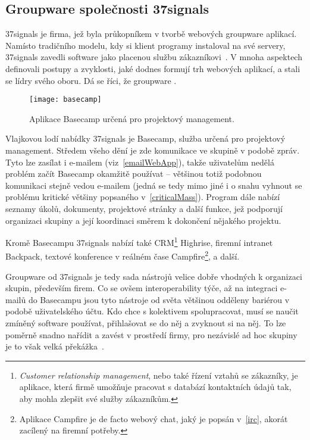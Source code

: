 \documentclass[12pt,oneside,final]{fithesis2}
\begin{document}
\subsection{Groupware společnosti 37signals}\label{37signals}
37signals je firma, jež byla průkopníkem v tvorbě webových groupware aplikací. Namísto tradičního modelu, kdy si klient programy instaloval na své servery, 37signals zavedli software jako placenou službu zákazníkovi~\cite{37signals2008getting}. V mnoha aspektech definovali postupy a zvyklosti, jaké dodnes formují trh webových aplikací, a stali se lídry svého oboru. Dá se říci, že groupware .

\begin{figure}[H]
    \texttt{[image: basecamp]}
    \caption{Aplikace Basecamp určená pro projektový management.}
\end{figure}

Vlajkovou lodí nabídky 37signals je Basecamp, služba určená pro projektový management. Středem všeho dění je zde komunikace ve skupině v podobě zpráv. Tyto lze zasílat i e-mailem (viz~\ref{emailWebApp}), takže uživatelům nedělá problém začít Basecamp okamžitě používat -- většinou totiž podobnou komunikaci stejně vedou e-mailem (jedná se tedy mimo jiné i o snahu vyhnout se problému kritické většiny popsaného v~\ref{criticalMass}). Program dále nabízí seznamy úkolů, dokumenty, projektové stránky a další funkce, jež podporují organizaci skupiny a její koordinaci směrem k dokončení nějakého projektu.

Kromě Basecampu 37signals nabízí také CRM\footnote{\emph{Customer relationship management}, nebo také řízení vztahů se zákazníky, je aplikace, která firmě umožňuje pracovat s databází kontaktních údajů tak, aby mohla zlepšit své služby zákazníkům.} Highrise, firemní intranet Backpack, textové konference v reálném čase Campfire\footnote{Aplikace Campfire je de facto webový chat, jaký je popsán v~\ref{irc}, akorát zacílený na firemní potřeby.}, a další.

Groupware od 37signals je tedy sada nástrojů velice dobře vhodných k organizaci skupin, především firem. Co se ovšem interoperability týče, až na integraci e-mailů do Basecampu jsou tyto nástroje od světa většinou odděleny bariérou v podobě uživatelského účtu. Kdo chce s kolektivem spolupracovat, musí se naučit zmíněný software používat, přihlašovat se do něj a zvyknout si na něj. To lze poměrně snadno nařídit a zavést v prostředí firmy, pro nezávislé ad hoc skupiny je to však velká překážka~\cite{grudin1994groupware}.
\end{document}
